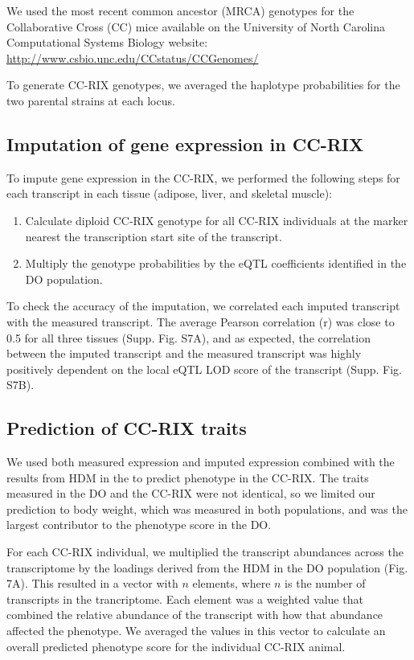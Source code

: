 \documentclass[
]{article}
\providecommand{\tightlist}{%
  \setlength{\itemsep}{0pt}\setlength{\parskip}{0pt}}
\begin{document}
We used the most recent common ancestor (MRCA) genotypes for the
Collaborative Cross (CC) mice available on the University of North
Carolina Computational Systems Biology website:
\url{http://www.csbio.unc.edu/CCstatus/CCGenomes/}

To generate CC-RIX genotypes, we averaged the haplotype probabilities
for the two parental strains at each locus.

\subsection{Imputation of gene expression in
CC-RIX}\label{imputation-of-gene-expression-in-cc-rix}

To impute gene expression in the CC-RIX, we performed the following
steps for each transcript in each tissue (adipose, liver, and skeletal
muscle):

\begin{enumerate}
\def\labelenumi{\arabic{enumi}.}
\tightlist
\item
  Calculate diploid CC-RIX genotype for all CC-RIX individuals at the
  marker nearest the transcription start site of the transcript.
\item
  Multiply the genotype probabilities by the eQTL coefficients
  identified in the DO population.
\end{enumerate}

To check the accuracy of the imputation, we correlated each imputed
transcript with the measured transcript. The average Pearson correlation
(r) was close to 0.5 for all three tissues (Supp. Fig. S7A), and as
expected, the correlation between the imputed transcript and the
measured transcript was highly positively dependent on the local eQTL
LOD score of the transcript (Supp. Fig. S7B).

\subsection{Prediction of CC-RIX
traits}\label{prediction-of-cc-rix-traits}

We used both measured expression and imputed expression combined with
the results from HDM in the to predict phenotype in the CC-RIX. The
traits measured in the DO and the CC-RIX were not identical, so we
limited our prediction to body weight, which was measured in both
populations, and was the largest contributor to the phenotype score in
the DO.

For each CC-RIX individual, we multiplied the transcript abundances
across the transcriptome by the loadings derived from the HDM in the DO
population (Fig. 7A). This resulted in a vector with \(n\) elements,
where \(n\) is the number of transcripts in the trancriptome. Each
element was a weighted value that combined the relative abundance of the
transcript with how that abundance affected the phenotype. We averaged
the values in this vector to calculate an overall predicted phenotype
score for the individual CC-RIX animal.
\end{document}
